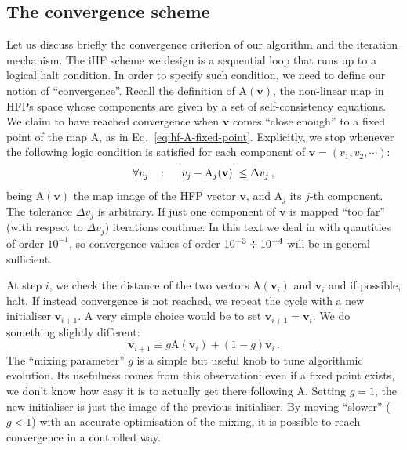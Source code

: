 \subsection{The convergence scheme}\label{subsec:reject-mix-iterate}

Let us discuss briefly the convergence criterion of our algorithm and the iteration mechanism. The iHF scheme we design is a sequential loop that runs up to a logical halt condition. In order to specify such condition, we need to define our notion of ``convergence''. Recall the definition of $\mathrm{A}(\mathbf{v})$, the non-linear map in HFPs space whose components are given by a set of self-consistency equations. We claim to have reached convergence when $\mathbf{v}$ comes ``close enough'' to a fixed point of the map $\mathrm{A}$, as in Eq.~\eqref{eq:hf-A-fixed-point}. Explicitly, we stop whenever the following logic condition is satisfied for each component of $\mathbf{v} = (v_1, v_2, \cdots)$:
\[
	\forall v_j
	\quad\colon\quad
	\abs{v_j-\mathrm{A}_j(\mathbf{v})} \le \Delta v_j \, ,
\]
being $\mathrm{A}(\mathbf{v})$ the map image of the HFP vector $\mathbf{v}$, and $\mathrm{A}_j$ its $j$-th component. The tolerance $\Delta v_j$ is arbitrary. If just one component of $\mathbf{v}$ is mapped ``too far'' (with respect to $\Delta v_j$) iterations continue. In this text we deal in with quantities of order $10^{-1}$, so convergence values of order $10^{-3} \divisionsymbol 10^{-4}$ will be in general sufficient. 

At step $i$, we check the distance of the two vectors $\mathrm{A}(\mathbf{v}_i)$ and $\mathbf{v}_i$ and if possible, halt. If instead convergence is not reached, we repeat the cycle with a new initialiser $\mathbf{v}_{i+1}$. A very simple choice would be to set $\mathbf{v}_{i+1} = \mathbf{v}_i$. We do something slightly different:
\begin{equation}\label{eq:mix}
	\mathbf{v}_{i+1} \equiv g \mathrm{A} \left( \mathbf{v}_{i} \right) + (1-g) \mathbf{v}_{i} \, .
\end{equation}
The ``mixing parameter'' $g$ is a simple but useful knob to tune algorithmic evolution. Its usefulness comes from this observation: even if a fixed point exists, we don't know how easy it is to actually get there following $\mathrm{A}$. Setting $g=1$, the new initialiser is just the image of the previous initialiser. By moving ``slower'' ($g<1$) with an accurate optimisation of the mixing, it is possible to reach convergence in a controlled way.

